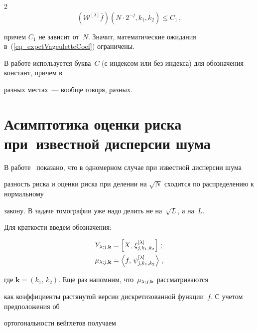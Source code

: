 \begin{multicols}{2}
\begin{equation}
\label{eq_WaveletCoeffUpperBoundTomo}


\left(\mathcal{W}^{[\lambda]}\bar f\right)\left(N\cdot 2^{-j},k_1,k_2\right) \leqslant C_1\,,


\end{equation}


причем $C_1$ не зависит от~$N$. Значит, математические ожидания в~(\ref{eq_expctVageuletteCoef}) ограничены.





В работе используется буква~$C$ (с индексом или без индекса) для обозначения констант, причем в 


разных местах~--- вообще говоря, разных.





\section{Асимптотика оценки риска при~известной дисперсии шума}\label{sect_ConsitKnownSTomo}





В работе~\cite{MarkinLimitDistr} показано, что в одномерном случае при известной дисперсии шума 


разность риска и оценки риска при делении на $\sqrt{N}$ сходится по распределению к нормальному 


закону. В задаче томографии уже надо делить не на~$\sqrt{L}$, а на~$L$.





Для краткости введем обозначения:


\begin{align*}


\Yljk &= \left[X,\,\xi^{[\lambda]}_{j,k_1,k_2}\right]\,;\\


\muljk &= \left\langle f,\,\psi^{[\lambda]}_{j,k_1,k_2}\right\rangle\,,


\end{align*}


где $\mathbf{k}=\left(k_1,\,k_2\right)$. Еще раз напомним, что~$\mu_{\lambda;j,\mathbf{k}}$ рассматриваются 


как коэффициенты растянутой версии дискретизованной функции~$f$. С учетом предположения об 


ортогональности вейглетов получаем


\begin{equation}



\end{equation}
\end{multicols}
